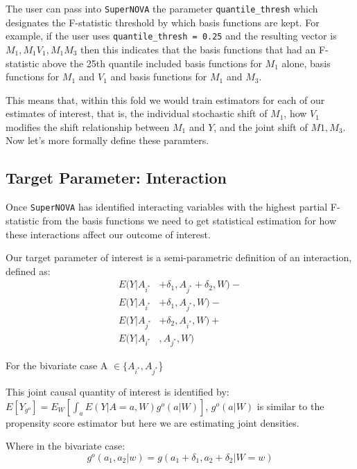 \documentclass[
]{article}
\begin{document}
The user can pass into \texttt{SuperNOVA} the parameter
\texttt{quantile\_thresh} which designates the F-statistic threshold by
which basis functions are kept. For example, if the user uses
\texttt{quantile\_thresh\ =\ 0.25} and the resulting vector is
\(M_1, M_1V_1, M_1M_3\) then this indicates that the basis functions
that had an F-statistic above the 25th quantile included basis functions
for \(M_1\) alone, basis functions for \(M_1\) and \(V_1\) and basis
functions for \(M_1\) and \(M_3\).

This means that, within this fold we would train estimators for each of
our estimates of interest, that is, the individual stochastic shift of
\(M_1\), how \(V_1\) modifies the shift relationship between \(M_1\) and
\(Y\), and the joint shift of \(M1,M_3\). Now let's more formally define
these paramters.

\hypertarget{target-parameter-interaction}{%
\subsection{Target Parameter:
Interaction}\label{target-parameter-interaction}}

Once \texttt{SuperNOVA} has identified interacting variables with the
highest partial F-statistic from the basis functions we need to get
statistical estimation for how these interactions affect our outcome of
interest.

Our target parameter of interest is a semi-parametric definition of an
interaction, defined as: \begin{equation} \label{eq1}
\begin{split}
E(Y|A_{i^*} &+ \delta_1, A_{j^*} + \delta_2, W) - \\ 
E(Y|A_{i^*} &+ \delta_1, A_{j^*}, W) - \\ 
E(Y|A_{j^*} &+ \delta_2,  A_{i^*}, W) + \\
E(Y|A_{i^*}&, A_{j^*}, W) 
\end{split}
\end{equation}

For the bivariate case A \(\in \{A_{i^*}, A_{j^*}\)\}

This joint causal quantity of interest is identified by:
\(E[Y_{g^o}] = E_W [\int_a E(Y|A=a, W)g^o(a|W)]\), \(g^o(a|W)\) is
similar to the propensity score estimator but here we are estimating
joint densities.

Where in the bivariate case:
\[g^o(a_1, a_2|w) = g(a_1 + \delta_1, a_2 + \delta_2|W = w)\]
\end{document}
